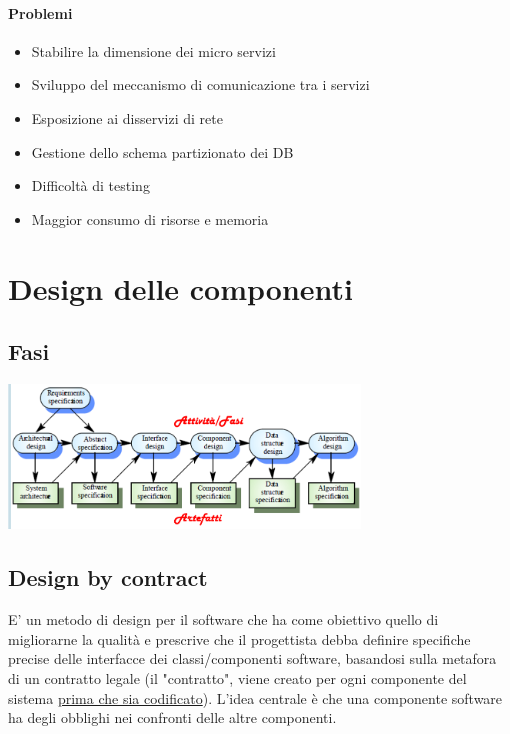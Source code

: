 \documentclass[12pt, a4paper]{report}
\begin{document}
\subsubsection{Problemi}
\begin{itemize}
    \item Stabilire la dimensione dei micro servizi
    \item Sviluppo del meccanismo di comunicazione tra i servizi
    \item Esposizione ai disservizi di rete
    \item Gestione dello schema partizionato dei DB
    \item Difficoltà di testing
    \item Maggior consumo di risorse e memoria
\end{itemize}
\chapter{Design delle componenti}
\section{Fasi}
\begin{center}
    \includegraphics[width=0.7\textwidth]{Immagini/processocomponentifasi.png}
\end{center}
\section{Design by contract}
E' un metodo di design per il software che ha come obiettivo quello  di migliorarne la qualità e prescrive che il progettista debba definire specifiche precise delle interfacce dei classi/componenti software, basandosi sulla metafora di un contratto legale (il "contratto", viene creato per ogni componente del sistema \underline{prima che sia codificato}). L'idea centrale è che una componente software ha degli obblighi nei confronti delle altre componenti.
\end{document}
